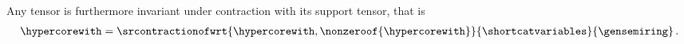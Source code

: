 Any tensor is furthermore invariant under contraction with its support tensor, that is
\begin{align*}
    \hypercorewith =
    \srcontractionofwrt{\hypercorewith,\nonzeroof{\hypercorewith}}{\shortcatvariables}{\gensemiring} \, .
\end{align*}